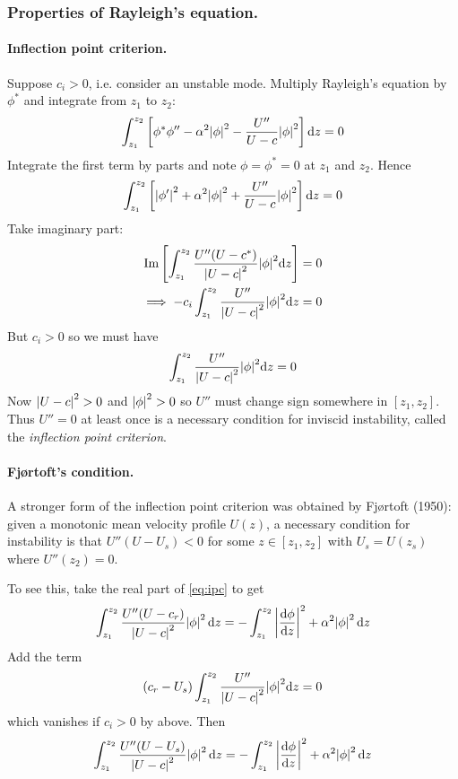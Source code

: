 \documentclass{jknotes}
\begin{document}
\subsubsection{Properties of Rayleigh's equation.}
\paragraph{Inflection point criterion.}
Suppose $c_i > 0$, i.e. consider an unstable mode. Multiply Rayleigh's
equation by $\phi^*$ and integrate from $z_1$ to $z_2$:
\begin{equation}
	\int_{z_1}^{z_2} \left[\phi^* \phi'' - \alpha^2 \abs{\phi}^2 - \frac{U''}{U-c}
	\abs{\phi}^2 \right]\diffd z = 0
\end{equation}
Integrate the first term by parts and note $\phi = \phi^* = 0$ at $z_1$ and
$z_2$. Hence
\begin{equation}
	\int_{z_1}^{z_2} \left[\abs{\phi'}^2  + \alpha^2 \abs{\phi}^2 +
	\frac{U''}{U-c}\abs{\phi}^2 \right] \diffd z =0 \label{eq:ipc}
\end{equation}
Take imaginary part:
\begin{align}
	\Im \left[ \int_{z_1}^{z_2} \frac{U''(U-c^*)}{\abs{U-c}^2} \abs{\phi}^2
	 \diffd z \right]&= 0 \\
\implies
	-c_i\int_{z_1}^{z_2} \frac{U''}{\abs{U-c}^2} \abs{\phi}^2
	\diffd z &= 0
\end{align}
But $c_i > 0$ so we must have
\begin{equation}
\int_{z_1}^{z_2} \frac{U''}{\abs{U-c}^2} \abs{\phi}^2
	\diffd z  = 0
\end{equation}
Now $\abs{U-c}^2 > 0$ and $\abs{\phi}^2 > 0 $ so $U''$ must change sign
somewhere in $\left[z_1,z_2\right]$. Thus $U''=0$ at least once is a necessary
condition for inviscid instability, called the \emph{inflection point
criterion}.

\paragraph{Fj\o rtoft's condition.}
A stronger form of the inflection point criterion was obtained by Fj\o rtoft
(1950): given a monotonic mean velocity profile $U(z)$, a necessary condition
for instability is that $U''(U-U_s) < 0$ for some $z \in \left[ z_1, z_2
\right]$ with $U_s = U(z_s)$ where $U''(z_2) = 0$.

To see this, take the real part of \eqref{eq:ipc} to get
\begin{equation}
	\int_{z_1}^{z_2} \frac{U''(U-c_r)}{\abs{U-c}^2} \abs{\phi}^2 \, \diffd z =
	-\int_{z_1}^{z_2} \abs{\frac{\diffd \phi}{\diffd z}}^2 + \alpha^2
	\abs{\phi}^2 \, \diffd z
\end{equation}
Add the term
\begin{equation}
	(c_r - U_s)\int_{z_1}^{z_2} \frac{U''}{\abs{U-c}^2} \abs{\phi}^2
	\diffd z  = 0
\end{equation}
which vanishes if $c_i > 0$ by above. Then
\begin{equation}
	\int_{z_1}^{z_2} \frac{U''(U-U_s)}{\abs{U-c}^2} \abs{\phi}^2 \, \diffd z =
	-\int_{z_1}^{z_2} \abs{\frac{\diffd \phi}{\diffd z}}^2 + \alpha^2
	\abs{\phi}^2 \, \diffd z
\end{equation}
\end{document}

